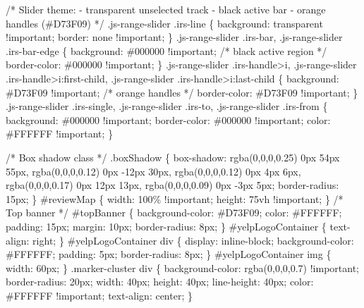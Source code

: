 \documentclass[
  12pt,
  letterpaper,
  DIV=11,
  numbers=noendperiod]{scrartcl}
\newenvironment{Shaded}{\begin{snugshade}}{\end{snugshade}}
\newcommand{\StringTok}[1]{\textcolor[rgb]{0.62,0.80,1.00}{#1}}
\begin{document}
\begin{Shaded}
\begin{Highlighting}[]
\StringTok{      /* Slider theme:}
\StringTok{         {-} transparent unselected track}
\StringTok{         {-} black active bar}
\StringTok{         {-} orange handles (\#D73F09)}
\StringTok{      */}
\StringTok{      .js{-}range{-}slider .irs{-}line \{}
\StringTok{        background: transparent !important;}
\StringTok{        border: none !important;}
\StringTok{      \}}
\StringTok{      .js{-}range{-}slider .irs{-}bar,}
\StringTok{      .js{-}range{-}slider .irs{-}bar{-}edge \{}
\StringTok{        background: \#000000 !important; /* black active region */}
\StringTok{        border{-}color: \#000000 !important;}
\StringTok{      \}}
\StringTok{      .js{-}range{-}slider .irs{-}handle\textgreater{}i,}
\StringTok{      .js{-}range{-}slider .irs{-}handle\textgreater{}i:first{-}child,}
\StringTok{      .js{-}range{-}slider .irs{-}handle\textgreater{}i:last{-}child \{}
\StringTok{        background: \#D73F09 !important; /* orange handles */}
\StringTok{        border{-}color: \#D73F09 !important;}
\StringTok{      \}}
\StringTok{      .js{-}range{-}slider .irs{-}single,}
\StringTok{      .js{-}range{-}slider .irs{-}to,}
\StringTok{      .js{-}range{-}slider .irs{-}from \{}
\StringTok{        background: \#000000 !important;}
\StringTok{        border{-}color: \#000000 !important;}
\StringTok{        color: \#FFFFFF !important;}
\StringTok{      \}}

\StringTok{      /* Box shadow class */}
\StringTok{      .boxShadow \{}
\StringTok{        box{-}shadow: rgba(0,0,0,0.25) 0px 54px 55px,}
\StringTok{                    rgba(0,0,0,0.12) 0px {-}12px 30px,}
\StringTok{                    rgba(0,0,0,0.12) 0px 4px 6px,}
\StringTok{                    rgba(0,0,0,0.17) 0px 12px 13px,}
\StringTok{                    rgba(0,0,0,0.09) 0px {-}3px 5px;}
\StringTok{        border{-}radius: 15px;}
\StringTok{      \}}
\StringTok{      \#reviewMap \{}
\StringTok{        width: 100\% !important;}
\StringTok{        height: 75vh !important;}
\StringTok{      \}}
\StringTok{      /* Top banner */}
\StringTok{      \#topBanner \{}
\StringTok{        background{-}color: \#D73F09;}
\StringTok{        color: \#FFFFFF;}
\StringTok{        padding: 15px;}
\StringTok{        margin: 10px;}
\StringTok{        border{-}radius: 8px;}
\StringTok{      \}}
\StringTok{      \#yelpLogoContainer \{}
\StringTok{        text{-}align: right;}
\StringTok{      \}}
\StringTok{      \#yelpLogoContainer div \{}
\StringTok{        display: inline{-}block;}
\StringTok{        background{-}color: \#FFFFFF;}
\StringTok{        padding: 5px;}
\StringTok{        border{-}radius: 8px;}
\StringTok{      \}}
\StringTok{      \#yelpLogoContainer img \{}
\StringTok{        width: 60px;}
\StringTok{      \}}
\StringTok{      .marker{-}cluster div \{}
\StringTok{        background{-}color: rgba(0,0,0,0.7) !important;}
\StringTok{        border{-}radius: 20px;}
\StringTok{        width: 40px;}
\StringTok{        height: 40px;}
\StringTok{        line{-}height: 40px;}
\StringTok{        color: \#FFFFFF !important;}
\StringTok{        text{-}align: center;}
\StringTok{      \}}


\end{Highlighting}
\end{Shaded}
\end{document}
